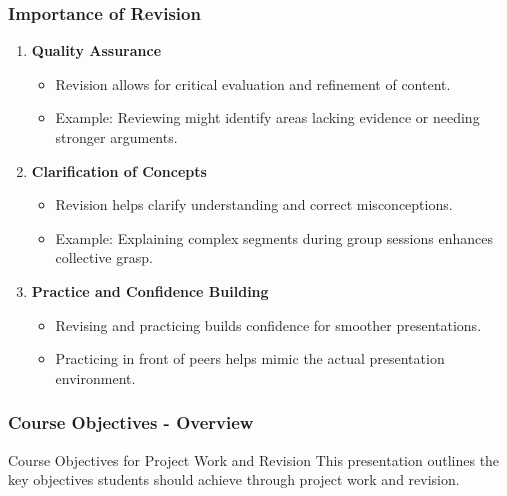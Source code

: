 \documentclass[aspectratio=169]{beamer}
\begin{document}
\begin{frame}[fragile]
  \frametitle{Importance of Revision}
  \begin{enumerate}
    \item \textbf{Quality Assurance}
      \begin{itemize}
        \item Revision allows for critical evaluation and refinement of content.
        \item Example: Reviewing might identify areas lacking evidence or needing stronger arguments.
      \end{itemize}
  
    \item \textbf{Clarification of Concepts}
      \begin{itemize}
        \item Revision helps clarify understanding and correct misconceptions.
        \item Example: Explaining complex segments during group sessions enhances collective grasp.
      \end{itemize}
  
    \item \textbf{Practice and Confidence Building}
      \begin{itemize}
        \item Revising and practicing builds confidence for smoother presentations.
        \item Practicing in front of peers helps mimic the actual presentation environment.
      \end{itemize}
  \end{enumerate}
\end{frame}

\begin{frame}[fragile]
    \frametitle{Course Objectives - Overview}
    \begin{block}{Course Objectives for Project Work and Revision}
        This presentation outlines the key objectives students should achieve through project work and revision.
    \end{block}
\end{frame}
\end{document}

